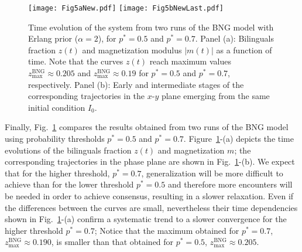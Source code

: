 \documentclass[review]{elsarticle}
\newcommand{\zmax}{z_\mathrm{max}}
\newcommand{\+}{\! + \!}
\begin{document}
\begin{figure}[ht!]
\centering
\texttt{[image: Fig5aNew.pdf]}
\texttt{[image: Fig5bNewLast.pdf]}
\caption{
    Time evolution of the system from two runs of the BNG model with Erlang prior ($\alpha=2$), for $p^*=0.5$ and $p^*=0.7$.
    Panel (a):  Bilinguals fraction $z(t)$ and magnetization modulus $|m(t)|$ as a function of time. 
    Note that the curves $z(t)$ reach maximum values $\zmax^\mathrm{BNG} \approx 0.205$ and $\zmax^\mathrm{BNG} \approx 0.19$ for $p^*=0.5$ and $p^*= 0.7$, respectively.
    Panel (b): Early and intermediate stages of the corresponding trajectories in the $x$-$y$ plane emerging from the same initial condition $I_0$. 
}
\label{fig:bending}      
\end{figure}


Finally, Fig.~\ref{fig:bending} compares the results obtained from two runs of the BNG model using probability thresholds $p^*=0.5$ and $p^*= 0.7$.
Figure~\ref{fig:bending}-(a) depicts the time evolutions of the bilinguals fraction $z(t)$ and magnetization $m$;
the corresponding trajectories in the phase plane are shown in Fig.~\ref{fig:bending}-(b).
We expect that for the higher threshold, $p^*= 0.7$, generalization will be more difficult to achieve than for the lower threshold $p^* = 0.5$ and therefore more encounters will be needed in order to achieve consensus, resulting in a slower relaxation.
Even if the differences between the curves are small, nevertheless their time dependencies shown in Fig.~\ref{fig:bending}-(a) confirm a systematic trend to a slower convergence for the higher threshold $p^*= 0.7$; 
Notice that the maximum obtained for $p^*= 0.7$, $\zmax^\mathrm{BNG} \approx 0.190$, is smaller than that obtained for $p^*=0.5$, $\zmax^\mathrm{BNG} \approx 0.205$.
\end{document}
